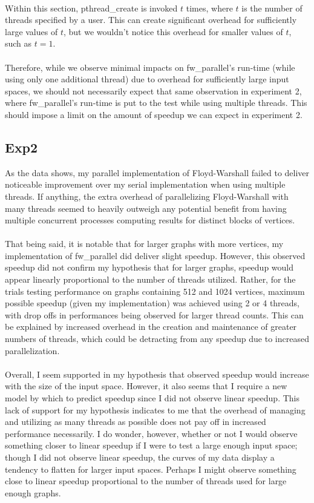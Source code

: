 \documentclass[]{article}
\begin{document}
	\\
	Within this section, pthread\_create is invoked $t$ times, where $t$ is the number of threads specified by a user. This can create significant overhead for sufficiently large values of $t$, but we wouldn't notice this overhead for smaller values of $t$, such as $t = 1$.
	\\\\
	Therefore, while we observe minimal impacts on fw\_parallel's run-time (while using only one additional thread) due to overhead for sufficiently large input spaces, we should not necessarily expect that same observation in experiment 2, where fw\_parallel's run-time is put to the test while using multiple threads. This should impose a limit on the amount of speedup we can expect in experiment 2.
	
	\subsection{Exp2}
	As the data shows, my parallel implementation of Floyd-Warshall failed to deliver noticeable improvement over my serial implementation when using multiple threads. If anything, the extra overhead of parallelizing Floyd-Warshall with many threads seemed to heavily outweigh any potential benefit from having multiple concurrent processes computing results for distinct blocks of vertices.
	\\\\
	That being said, it is notable that for larger graphs with more vertices, my implementation of fw\_parallel did deliver slight speedup. However, this observed speedup did not confirm my hypothesis that for larger graphs, speedup would appear linearly proportional to the number of threads utilized. Rather, for the trials testing performance on graphs containing 512 and 1024 vertices, maximum possible speedup (given my implementation) was achieved using 2 or 4 threads, with drop offs in performances being observed for larger thread counts. This can be explained by increased overhead in the creation and maintenance of greater numbers of threads, which could be detracting from any speedup due to increased parallelization.
	\\\\
	Overall, I seem supported in my hypothesis that observed speedup would increase with the size of the input space. However, it also seems that I require a new model by which to predict speedup since I did not observe linear speedup. This lack of support for my hypothesis indicates to me that the overhead of managing and utilizing as many threads as possible does not pay off in increased performance necessarily. I do wonder, however, whether or not I would observe something closer to linear speedup if I were to test a large enough input space; though I did not observe linear speedup, the curves of my data display a tendency to flatten for larger input spaces. Perhaps I might observe something close to linear speedup proportional to the number of threads used for large enough graphs.
	\\
\end{document}
